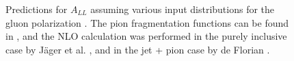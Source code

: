 \begin{figure}
  \newline
  \caption{Predictions for $A_{LL}$ assuming various input distributions for the gluon polarization \cite{Gluck:2000dy, Gehrmann:1995ag, deFlorian:2008mr}. The pion fragmentation functions can be found in \cite{deFlorian:2007nk}, and the NLO calculation was performed in the purely inclusive case by J\"ager et al. \cite{Jager:2002xm}, and in the jet + pion case by de Florian \cite{deFlorian:2009fw}.}
  \label{fig:all-predictions}
\end{figure}
